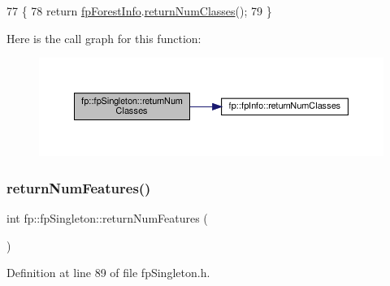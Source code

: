 \begin{DoxyCode}
77                                          \{
78                 \textcolor{keywordflow}{return} \hyperlink{classfp_1_1fpSingleton_a85965009befa72a749ae498fa5b6ccfa}{fpForestInfo}.\hyperlink{classfp_1_1fpInfo_ae93937d429b68d88f40fd4f40b3339da}{returnNumClasses}();
79             \}
\end{DoxyCode}
Here is the call graph for this function\+:
\nopagebreak
\begin{figure}[H]
\begin{center}
\leavevmode
\includegraphics[width=350pt]{classfp_1_1fpSingleton_a5602580110329a6b25602b1789e4e2c2_cgraph}
\end{center}
\end{figure}
\mbox{\label{classfp_1_1fpSingleton_a97cbcad5ae9daa8c747fd4db84928c20}} 
\subsubsection{\texorpdfstring{return\+Num\+Features()}{returnNumFeatures()}}
{\footnotesize\ttfamily int fp\+::fp\+Singleton\+::return\+Num\+Features (\begin{DoxyParamCaption}{ }\end{DoxyParamCaption})\hspace{0.3cm}{\ttfamily [inline]}}



Definition at line 89 of file fp\+Singleton.\+h.


